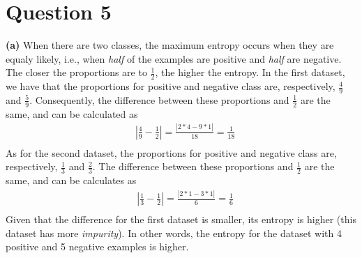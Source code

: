 \documentclass[leqno]{article}
\begin{document}
\section*{Question 5} \textbf{(a)} When there are two classes, the maximum entropy occurs when they are equaly likely, i.e., 
when \textit{half} of the examples are positive and \textit{half} are negative. The closer the proportions are to $\frac{1}{2}$, 
the higher the entropy. In the first dataset, we have that the proportions for positive and negative class are, respectively, 
$\frac{4}{9}$ and $\frac{5}{9}$. Consequently, the difference between these proportions and $\frac{1}{2}$ are the same, and can 
be calculated as
\begin{equation*}
\begin{split}
&|\frac{4}{9} - \frac{1}{2}| = \frac{|2*4 - 9*1|}{18} = \frac{1}{18} \\
\end{split}
\end{equation*}
As for the second dataset, the proportions for positive and negative class are, respectively, $\frac{1}{3}$ and $\frac{2}{3}$. 
The difference between these proportions and $\frac{1}{2}$ are the same, and can be calculates as 
\begin{equation*}
\begin{split}
&|\frac{1}{3} - \frac{1}{2}| = \frac{|2*1 - 3*1|}{6} = \frac{1}{6} \\
\end{split}
\end{equation*}
Given that the difference for the first dataset is smaller, its entropy is higher (this dataset has more 
\textit{impurity}). In other words, the entropy for the dataset with 4 positive and 
5 negative examples is higher.

\hfill
\end{document}
